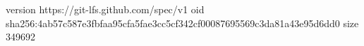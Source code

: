 version https://git-lfs.github.com/spec/v1
oid sha256:4ab57c587e3fbfaa95cfa5fae3cc5cf342cf00087695569c3da81a43e95d6dd0
size 349692

